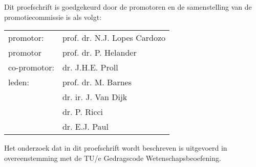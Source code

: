 \newpage
\thispagestyle{empty}

\noindent
Dit proefschrift is goedgekeurd door de promotoren en de samenstelling van de promotiecommissie is als volgt:\\[7mm]

\noindent
\begin{tabular}{@{}l p{9.8cm}}
promotor:                   &   prof. dr. N.J. Lopes Cardozo \\
promotor                    &   prof. dr. P. Helander \\
co-promotor:                &   dr. J.H.E. Proll \\
leden:                      &   prof. dr. M. Barnes \\
                            &   dr. ir. J. Van Dijk \\
                            &   dr. P. Ricci \\
                            &   dr. E.J. Paul \\
\end{tabular}

\vfill
\noindent
Het onderzoek dat in dit proefschrift wordt beschreven is uitgevoerd in overeenstemming met de TU/e Gedragscode Wetenschapsbeoefening.
